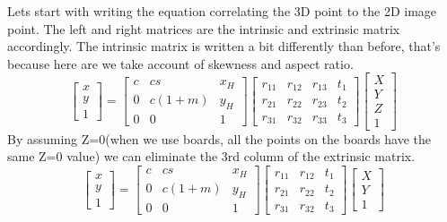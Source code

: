 Lets start with writing the equation correlating the 3D point to the 2D image point. The left and right matrices are the intrinsic and extrinsic matrix accordingly. The intrinsic matrix is written a bit differently than before, that's because here are we take account of skewness and aspect ratio. 
\[
    \begin{bmatrix}
    x \\
    y \\
    1 
    \end{bmatrix}
    =
    \begin{bmatrix}
    c   &   cs  &   x_H \\
    0   &   c(1+m)  &   y_H \\
    0   &   0   &   1 
    \end{bmatrix}
    \begin{bmatrix}
    r_{11}   &   r_{12}  &  r_{13}  &   t_1 \\
    r_{21}   &   r_{22}  &  r_{23}  &   t_2 \\
    r_{31}   &   r_{32}  &  r_{33}  &   t_3
    \end{bmatrix}
    \begin{bmatrix}
        X \\
        Y \\
        Z \\
        1
    \end{bmatrix}
\]
By assuming Z=0(when we use boards, all the points on the boards have the same Z=0 value) we can eliminate the 3rd column of the extrinsic matrix. 
\begin{equation}
    \begin{bmatrix}
    x \\
    y \\
    1 
    \end{bmatrix}
    =
    \begin{bmatrix}
    c   &   cs  &   x_H \\
    0   &   c(1+m)  &   y_H \\
    0   &   0   &   1 
    \end{bmatrix}
    \begin{bmatrix}
    r_{11}   &   r_{12}  &   t_1 \\
    r_{21}   &   r_{22}  &   t_2 \\
    r_{31}   &   r_{32}   &   t_3
    \end{bmatrix}
        \begin{bmatrix}
        X \\
        Y \\
        1
    \end{bmatrix}
    \label{simplifiedmappingLong}
\end{equation}
